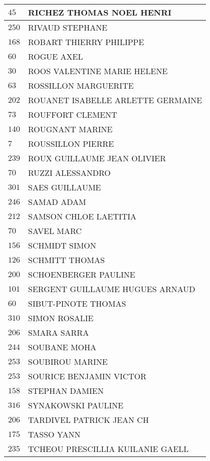 \begin{xltabular}{\linewidth}{|l|X|}
    \hline
    $45$ & RICHEZ THOMAS NOEL HENRI \\
    \hline
    $250$ & RIVAUD STEPHANE \\
    \hline
    $168$ & ROBART THIERRY PHILIPPE \\
    \hline
    $60$ & ROGUE AXEL \\
    \hline
    $30$ & ROOS VALENTINE MARIE HELENE \\
    \hline
    $63$ & ROSSILLON MARGUERITE \\
    \hline
    $202$ & ROUANET ISABELLE ARLETTE GERMAINE \\
    \hline
    $73$ & ROUFFORT CLEMENT \\
    \hline
    $140$ & ROUGNANT MARINE \\
    \hline
    $7$ & ROUSSILLON PIERRE \\
    \hline
    $239$ & ROUX GUILLAUME JEAN OLIVIER \\
    \hline
    $70$ & RUZZI ALESSANDRO \\
    \hline
    $301$ & SAES GUILLAUME \\
    \hline
    $246$ & SAMAD ADAM \\
    \hline
    $212$ & SAMSON CHLOE LAETITIA \\
    \hline
    $70$ & SAVEL MARC \\
    \hline
    $156$ & SCHMIDT SIMON \\
    \hline
    $126$ & SCHMITT THOMAS \\
    \hline
    $200$ & SCHOENBERGER PAULINE \\
    \hline
    $101$ & SERGENT GUILLAUME HUGUES ARNAUD \\
    \hline
    $60$ & SIBUT-PINOTE THOMAS \\
    \hline
    $310$ & SIMON ROSALIE \\
    \hline
    $206$ & SMARA SARRA \\
    \hline
    $244$ & SOUBANE MOHA \\
    \hline
    $253$ & SOUBIROU MARINE \\
    \hline
    $253$ & SOURICE BENJAMIN VICTOR \\
    \hline
    $158$ & STEPHAN DAMIEN \\
    \hline
    $316$ & SYNAKOWSKI PAULINE \\
    \hline
    $206$ & TARDIVEL PATRICK JEAN CH \\
    \hline
    $175$ & TASSO YANN \\
    \hline
    $235$ & TCHEOU PRESCILLIA KUILANIE GAELL \\

\end{xltabular}
